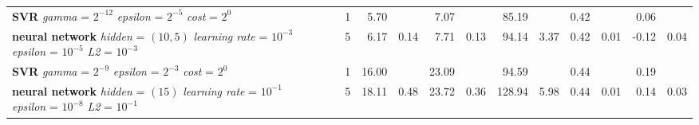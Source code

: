 {\begin{table}[ht]
\begin{tabular}{lllrrrrrrrrrrr}
  \makecell[tl]{\textbf{SVR}\\ \textit{gamma} = $2^{-12}$ \\ \textit{epsilon} = $2^{-5}$ \\ \textit{cost} = $2^{0}$} & \cellcolor[HTML]{FFFF88}{summer} & \cellcolor[HTML]{EADAFF}{seasonal} &   1 & 5.70 &  & 7.07 &  & 85.19 &  & 0.42 &  & 0.06 &  \\ 
  \makecell[tl]{\textbf{neural network}\\ \textit{hidden} = $(10, 5)$ \\ \textit{learning rate} = $10^{-3}$ \\ \textit{epsilon} = $10^{-5}$ \\ \textit{L2} = $10^{-3}$} & \cellcolor[HTML]{FFFF88}{summer} & \cellcolor[HTML]{EADAFF}{seasonal} &   5 & 6.17 & 0.14 & 7.71 & 0.13 & 94.14 & 3.37 & 0.42 & 0.01 & -0.12 & 0.04 \\ 
  \makecell[tl]{\textbf{SVR}\\ \textit{gamma} = $2^{-9}$ \\ \textit{epsilon} = $2^{-3}$ \\ \textit{cost} = $2^{0}$} & \cellcolor[HTML]{FFAA88}{autumn} & \cellcolor[HTML]{FFFFFF}{all} &   1 & 16.00 &  & 23.09 &  & 94.59 &  & 0.44 &  & 0.19 &  \\ 
  \makecell[tl]{\textbf{neural network}\\ \textit{hidden} = $(15)$ \\ \textit{learning rate} = $10^{-1}$ \\ \textit{epsilon} = $10^{-8}$ \\ \textit{L2} = $10^{-1}$} & \cellcolor[HTML]{FFAA88}{autumn} & \cellcolor[HTML]{EADAFF}{seasonal} &   5 & 18.11 & 0.48 & 23.72 & 0.36 & 128.94 & 5.98 & 0.44 & 0.01 & 0.14 & 0.03 \\ 
   \bottomrule
\end{tabular}
\endgroup
\end{table}

}
